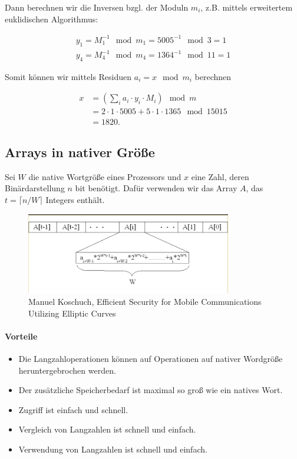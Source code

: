 Dann berechnen wir die Inversen bzgl. der Moduln $m_i$, z.B. mittels erweitertem euklidischen Algorithmus:

\begin{align*}
    y_1 = M_1^{-1} \mod m_1 = 5005^{-1} \mod 3 = 1 \\
    y_4 = M_4^{-1} \mod m_4 = 1364^{-1} \mod 11 = 1
\end{align*}

Somit können wir mittels Residuen $a_i = x \mod m_i$ berechnen 

\begin{align*}
    x &= \left(\sum_i a_i \cdot y_i \cdot M_i \right) \mod m \\
      &= 2\cdot 1 \cdot 5005 + 5 \cdot 1 \cdot 1365 \mod 15015 \\ 
      &= 1820.
\end{align*}

\subsection{Arrays in nativer Größe}

Sei $W$ die native Wortgröße eines Prozessors und $x$ eine Zahl, deren Binärdarstellung $n$ bit benötigt. Dafür verwenden wir das Array $A$, das $t = \lceil n/W \rceil$ Integers enthält.

\begin{figure}[h]
    \includegraphics[width=0.8\textwidth]{figures/fig01-arrays-native-size}
    \centering
    \caption{Manuel Koschuch, Efficient Security for Mobile Communications Utilizing Elliptic Curves}
\end{figure}

\paragraph{Vorteile}

\begin{itemize}
    \item Die Langzahloperationen können auf Operationen auf nativer Wordgröße heruntergebrochen werden.
    \item Der zusätzliche Speicherbedarf ist maximal so groß wie ein natives Wort.
    \item Zugriff ist einfach und schnell.
    \item Vergleich von Langzahlen ist schnell und einfach.
    \item Verwendung von Langzahlen ist schnell und einfach.
\end{itemize}

